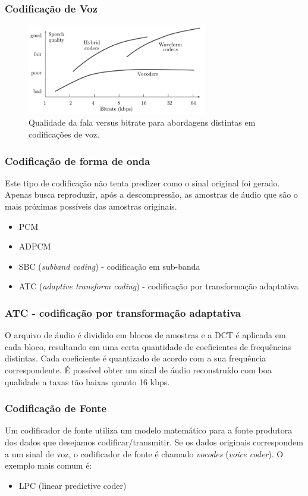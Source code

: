 \begin{frame}
  \frametitle{Codificação de Voz}
  \begin{figure}[h]
  \centering
  \includegraphics[width=0.7\textwidth]{images/speech_codecs.png}
  \caption{Qualidade da fala versus bitrate para abordagens distintas em codificações de voz.}
  \label{fig:speech_codecs}
  \end{figure}
\end{frame}

\begin{frame}
  \frametitle{Codificação de forma de onda}
  Este tipo de codificação não tenta predizer como o sinal original foi gerado.
  Apenas busca reproduzir, após a descompressão, as amostras de áudio que são
  o mais próximas possíveis das amostras originais.
  \begin{itemize}
  \item PCM
  \item ADPCM
  \item SBC (\emph{subband coding}) - codificação em sub-banda
  \item ATC (\emph{adaptive transform coding}) - codificação por transformação adaptativa
  \end{itemize}
\end{frame}

\begin{frame}
  \frametitle{ATC - codificação por transformação adaptativa}
   O arquivo de áudio é dividido em blocos de amostras e a DCT é aplicada
   em cada bloco, resultando em uma certa quantidade de coeficientes de frequências distintas.
   Cada coeficiente é quantizado de acordo com a sua frequência correspondente.
   É possível obter um sinal de áudio reconstruído com boa qualidade a taxas tão baixas quanto 16 kbps.
\end{frame}

\begin{frame}
  \frametitle{Codificação de Fonte}
  Um codificador de fonte utiliza um modelo matemático para a fonte produtora dos dados que desejamos codificar/transmitir.
  Se os dados originais correspondem a um sinal de voz, o codificador de fonte é chamado
  \emph{vocodes} (\emph{voice coder}). O exemplo mais comum é:
  \begin{itemize}
  \item LPC (linear predictive coder)
  \end{itemize}
\end{frame}


